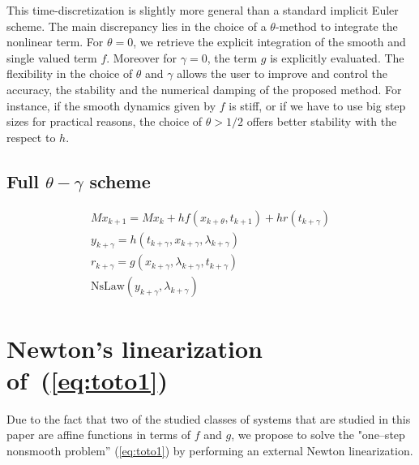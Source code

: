  This time-discretization is slightly more general than a standard implicit Euler scheme. The main discrepancy lies in the choice of a $\theta$-method to integrate the nonlinear term. For $\theta=0$, we retrieve the explicit integration of the smooth and  single valued term $f$. Moreover for $\gamma =0$, the term $g$ is explicitly evaluated. The flexibility in the choice of $\theta$ and $\gamma$ allows the user to improve and control the accuracy, the stability and the numerical damping of the proposed method. For instance, if the smooth dynamics given by $f$ is stiff, or if we have to use big step sizes for practical reasons, the choice of $\theta > 1/2$ offers better stability with the respect to $h$.

\subsection{Full $\theta-\gamma$ scheme}

  \begin{equation}
    \begin{array}{l}
      \label{eq:toto1-ter}
      M x_{k+1} = M x_{k} +h f(x_{k+\theta},t_{k+1}) + h r(t_{k+\gamma}) \\[2mm]
      y_{k+\gamma} =  h(t_{k+\gamma},x_{k+\gamma},\lambda _{k+\gamma}) \\[2mm]
      r_{k+\gamma} = g(x_{k+\gamma},\lambda_{k+\gamma},t_{k+\gamma})\\[2mm]
      \mbox{NsLaw} ( y_{k+\gamma} , \lambda_{k+\gamma})
    \end{array}
\end{equation}

\clearpage
\section{Newton's linearization of~(\ref{eq:toto1})} 

Due to the fact that  two of the  studied classes of systems that are studied in this paper are affine functions in terms of $f$ and $g$, we propose to solve the "one--step nonsmooth problem'' (\ref{eq:toto1}) by performing an external Newton linearization.

